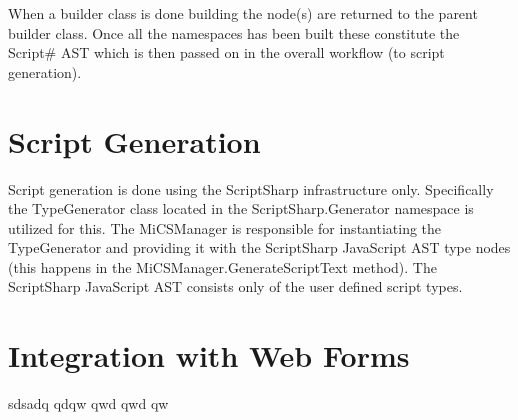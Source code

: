 	When a builder class is done building the node(s) are returned to the parent builder class. Once all the namespaces has been built these constitute the Script\# AST which is then passed on in the overall workflow (to script generation).

\section{Script Generation} %
\label{sec:script_generation}
	Script generation is done using the ScriptSharp infrastructure only. Specifically the TypeGenerator class located in the ScriptSharp.Generator namespace is utilized for this. The MiCSManager is responsible for instantiating the TypeGenerator and providing it with the ScriptSharp JavaScript AST type nodes (this happens in the MiCSManager.GenerateScriptText method). The ScriptSharp JavaScript AST consists only of the user defined script types.

\section{Integration with Web Forms} %
\label{sec:integration_with_web_forms}
	sdsadq qdqw qwd qwd qw 
